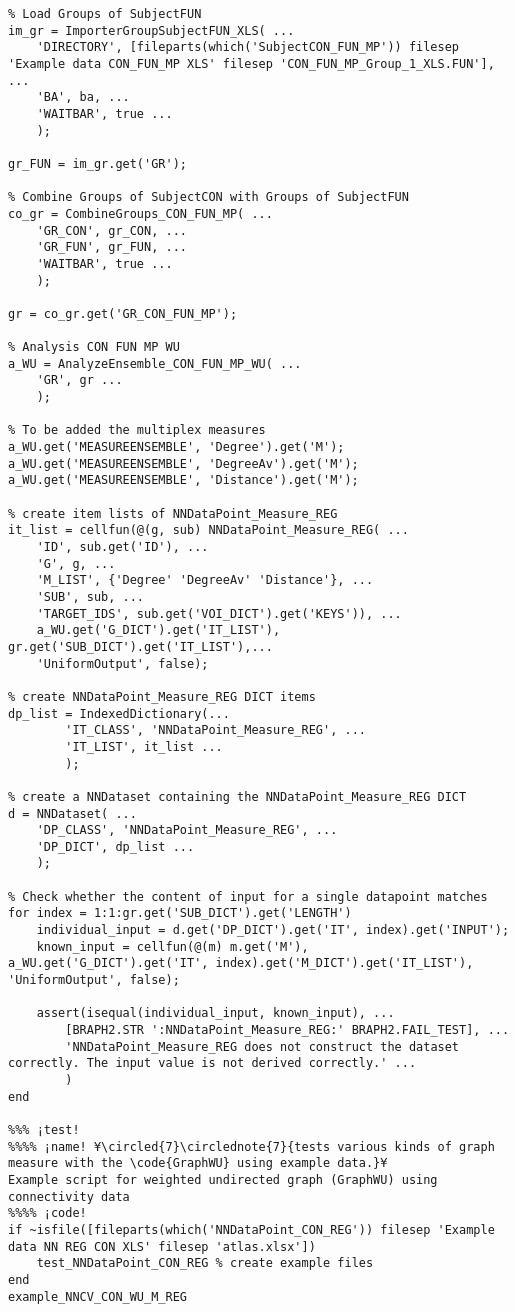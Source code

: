 \documentclass{tufte-handout}
\begin{document}
\begin{lstlisting}
% Load Groups of SubjectFUN
im_gr = ImporterGroupSubjectFUN_XLS( ...
    'DIRECTORY', [fileparts(which('SubjectCON_FUN_MP')) filesep 'Example data CON_FUN_MP XLS' filesep 'CON_FUN_MP_Group_1_XLS.FUN'], ...
    'BA', ba, ...
    'WAITBAR', true ...
    );

gr_FUN = im_gr.get('GR');

% Combine Groups of SubjectCON with Groups of SubjectFUN
co_gr = CombineGroups_CON_FUN_MP( ...
    'GR_CON', gr_CON, ...
    'GR_FUN', gr_FUN, ...
    'WAITBAR', true ...
    );

gr = co_gr.get('GR_CON_FUN_MP');

% Analysis CON FUN MP WU
a_WU = AnalyzeEnsemble_CON_FUN_MP_WU( ...
    'GR', gr ...
    );

% To be added the multiplex measures
a_WU.get('MEASUREENSEMBLE', 'Degree').get('M');
a_WU.get('MEASUREENSEMBLE', 'DegreeAv').get('M');
a_WU.get('MEASUREENSEMBLE', 'Distance').get('M');

% create item lists of NNDataPoint_Measure_REG
it_list = cellfun(@(g, sub) NNDataPoint_Measure_REG( ...
    'ID', sub.get('ID'), ...
    'G', g, ...
    'M_LIST', {'Degree' 'DegreeAv' 'Distance'}, ...
    'SUB', sub, ...
    'TARGET_IDS', sub.get('VOI_DICT').get('KEYS')), ...
    a_WU.get('G_DICT').get('IT_LIST'), gr.get('SUB_DICT').get('IT_LIST'),...
    'UniformOutput', false);

% create NNDataPoint_Measure_REG DICT items
dp_list = IndexedDictionary(...
        'IT_CLASS', 'NNDataPoint_Measure_REG', ...
        'IT_LIST', it_list ...
        );

% create a NNDataset containing the NNDataPoint_Measure_REG DICT
d = NNDataset( ...
    'DP_CLASS', 'NNDataPoint_Measure_REG', ...
    'DP_DICT', dp_list ...
    );

% Check whether the content of input for a single datapoint matches
for index = 1:1:gr.get('SUB_DICT').get('LENGTH')
    individual_input = d.get('DP_DICT').get('IT', index).get('INPUT');
    known_input = cellfun(@(m) m.get('M'), a_WU.get('G_DICT').get('IT', index).get('M_DICT').get('IT_LIST'), 'UniformOutput', false);

    assert(isequal(individual_input, known_input), ...
        [BRAPH2.STR ':NNDataPoint_Measure_REG:' BRAPH2.FAIL_TEST], ...
        'NNDataPoint_Measure_REG does not construct the dataset correctly. The input value is not derived correctly.' ...
        )
end

%%% ¡test!
%%%% ¡name! ¥\circled{7}\circlednote{7}{tests various kinds of graph measure with the \code{GraphWU} using example data.}¥
Example script for weighted undirected graph (GraphWU) using connectivity data
%%%% ¡code!
if ~isfile([fileparts(which('NNDataPoint_CON_REG')) filesep 'Example data NN REG CON XLS' filesep 'atlas.xlsx'])
    test_NNDataPoint_CON_REG % create example files
end
example_NNCV_CON_WU_M_REG


\end{lstlisting}
\end{document}
